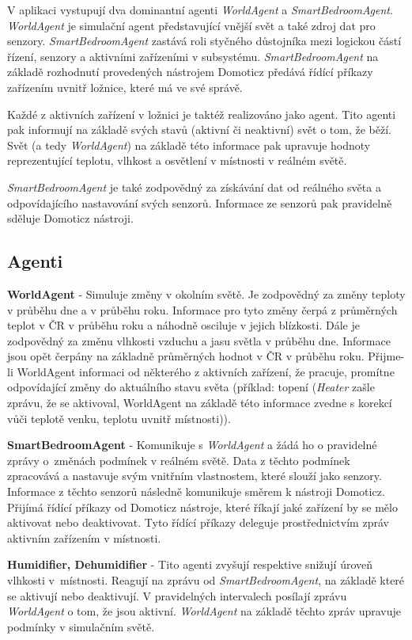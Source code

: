 \documentclass[a4paper,12pt]{article}
\begin{document}
    V aplikaci vystupují dva dominantní agenti \textit{WorldAgent} a \textit{SmartBedroomAgent}. \textit{WorldAgent} je simulační agent představující vnější svět a také zdroj dat pro senzory. \textit{SmartBedroomAgent} zastává roli styčného důstojníka mezi logickou částí řízení, senzory a aktivními zařízeními v subsystému. \textit{SmartBedroomAgent} na základě rozhodnutí provedených nástrojem Domoticz předává řídící příkazy zařízením uvnitř ložnice, které má ve své správě. 

    Každé z aktivních zařízení v ložnici je taktéž realizováno jako agent. Tito agenti pak informují na základě svých stavů (aktivní či neaktivní) svět o tom, že běží. Svět (a tedy \textit{WorldAgent}) na základě této informace pak upravuje hodnoty reprezentující teplotu, vlhkost a osvětlení v místnosti v reálném světě.

    \textit{SmartBedroomAgent} je také zodpovědný za získávání dat od reálného světa a odpovídajícího nastavování svých senzorů. Informace ze senzorů pak pravidelně sděluje Domoticz nástroji.

    \subsection{Agenti}
    \textbf{WorldAgent} - Simuluje změny v okolním světě. Je zodpovědný za změny teploty v průběhu dne a v průběhu roku. Informace pro tyto změny čerpá z průměrných teplot v ČR v průběhu roku a náhodně osciluje v jejich blízkosti. Dále je zodpovědný za změnu vlhkosti vzduchu a jasu světla v průběhu dne. Informace jsou opět čerpány na základně průměrných hodnot v ČR v průběhu roku. Přijme-li WorldAgent informaci od některého z aktivních zařízení, že pracuje, promítne odpovídající změny do aktuálního stavu světa (příklad: topení (\textit{Heater} zašle zprávu, že se aktivoval, WorldAgent na základě této informace zvedne s korekcí vůči teplotě venku, teplotu uvnitř místnosti)).
    
    \textbf{SmartBedroomAgent} - Komunikuje s \textit{WorldAgent} a žádá ho o pravidelné zprávy o~změnách podmínek v reálném světě. Data z těchto podmínek zpracovává a nastavuje svým vnitřním vlastnostem, které slouží jako senzory. Informace z těchto senzorů následně komunikuje směrem k nástroji Domoticz. Přijímá řídící příkazy od Domoticz nástroje, které říkají jaké zařízení by se mělo aktivovat nebo deaktivovat. Tyto řídící příkazy deleguje prostřednictvím zpráv aktivním zařízením v místnosti. 
    
    \textbf{Humidifier, Dehumidifier} - Tito agenti zvyšují respektive snižují úroveň vlhkosti v~místnosti. Reagují na zprávu od \textit{SmartBedroomAgent}, na základě které se aktivují nebo deaktivují. V pravidelných intervalech posílají zprávu \textit{WorldAgent} o tom, že jsou aktivní. \textit{WorldAgent} na základě těchto zpráv upravuje podmínky v simulačním světě.
    
\end{document}
